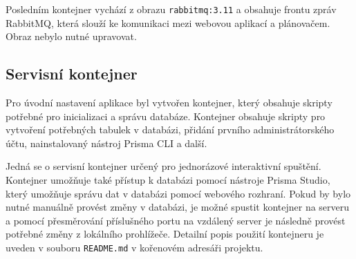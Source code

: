Posledním kontejner vychází z obrazu \texttt{rabbitmq:3.11} a obsahuje frontu zpráv RabbitMQ, která slouží ke komunikaci mezi webovou aplikací a plánovačem.
Obraz nebylo nutné upravovat.

\subsection{Servisní kontejner}

Pro úvodní nastavení aplikace byl vytvořen kontejner, který
obsahuje skripty potřebné pro inicializaci a správu databáze. Kontejner obsahuje skripty pro vytvoření potřebných tabulek v databázi,
přidání prvního administrátorského účtu, nainstalovaný nástroj Prisma CLI a další.

Jedná se o servisní kontejner určený pro jednorázové interaktivní spuštění. Kontejner umožňuje také přístup k databázi
pomocí nástroje Prisma Studio, který umožňuje správu dat v databázi pomocí webového rozhraní. Pokud by bylo nutné manuálně provést změny v databázi,
je možné spustit kontejner na serveru a pomocí přesměrování příslušného portu na vzdálený server je následně provést potřebné změny z lokálního prohlížeče.
Detailní popis použití kontejneru je uveden v souboru \texttt{README.md} v kořenovém adresáři projektu.